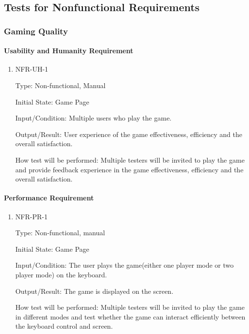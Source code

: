 \documentclass[12pt, titlepage]{article}
\begin{document}
\subsection{Tests for Nonfunctional Requirements}

\subsubsection{Gaming Quality}

\paragraph{Usability and Humanity Requirement}

\begin{enumerate}

\item{NFR-UH-1\\}

Type: Non-functional, Manual
					
Initial State: Game Page
					
Input/Condition: Multiple users who play the game. 

Output/Result: User experience of the game effectiveness, efficiency and the overall satisfaction. 
	
How test will be performed: Multiple testers will be invited to play the game and provide feedback experience in the game effectiveness, efficiency and the overall satisfaction. 

\end{enumerate}

\paragraph{Performance Requirement}

\begin{enumerate}

\item{NFR-PR-1\\}

Type: Non-functional, manual
					
Initial State: Game Page
					
Input/Condition: The user plays the game(either one player mode or two player mode) on the keyboard.

Output/Result: The game is displayed on the screen. 
	
How test will be performed: Multiple testers will be invited to play the game in different modes and test whether the game can interact efficiently between the keyboard control and screen.  

\end{enumerate}
\end{document}
